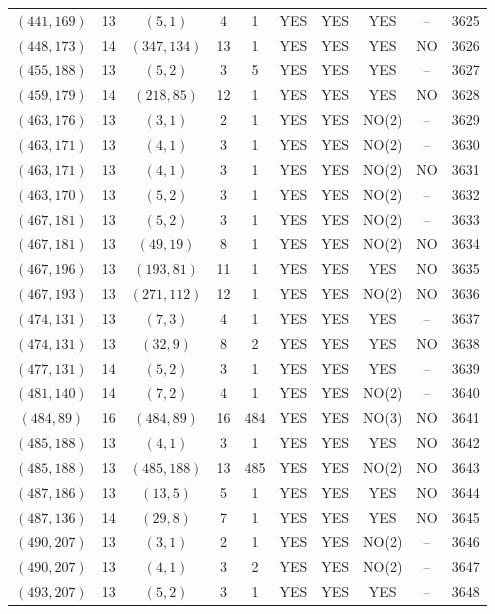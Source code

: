 \begin{longtable}{|c|c|c|c|c|c|c|c|c|c|}
$(441, 169)$ & 13 & $(5, 1)$ & 4 & 1 & YES & YES & YES & -- & 3625\\
$(448, 173)$ & 14 & $(347, 134)$ & 13 & 1 & YES & YES & YES & NO & 3626\\
$(455, 188)$ & 13 & $(5, 2)$ & 3 & 5 & YES & YES & YES & -- & 3627\\
$(459, 179)$ & 14 & $(218, 85)$ & 12 & 1 & YES & YES & YES & NO & 3628\\
$(463, 176)$ & 13 & $(3, 1)$ & 2 & 1 & YES & YES & NO(2) & -- & 3629\\
$(463, 171)$ & 13 & $(4, 1)$ & 3 & 1 & YES & YES & NO(2) & -- & 3630\\
$(463, 171)$ & 13 & $(4, 1)$ & 3 & 1 & YES & YES & NO(2) & NO & 3631\\
$(463, 170)$ & 13 & $(5, 2)$ & 3 & 1 & YES & YES & NO(2) & -- & 3632\\
$(467, 181)$ & 13 & $(5, 2)$ & 3 & 1 & YES & YES & NO(2) & -- & 3633\\
$(467, 181)$ & 13 & $(49, 19)$ & 8 & 1 & YES & YES & NO(2) & NO & 3634\\
$(467, 196)$ & 13 & $(193, 81)$ & 11 & 1 & YES & YES & YES & NO & 3635\\
$(467, 193)$ & 13 & $(271, 112)$ & 12 & 1 & YES & YES & NO(2) & NO & 3636\\
$(474, 131)$ & 13 & $(7, 3)$ & 4 & 1 & YES & YES & YES & -- & 3637\\
$(474, 131)$ & 13 & $(32, 9)$ & 8 & 2 & YES & YES & YES & NO & 3638\\
$(477, 131)$ & 14 & $(5, 2)$ & 3 & 1 & YES & YES & YES & -- & 3639\\
$(481, 140)$ & 14 & $(7, 2)$ & 4 & 1 & YES & YES & NO(2) & -- & 3640\\
$(484, 89)$ & 16 & $(484, 89)$ & 16 & 484 & YES & YES & NO(3) & NO & 3641\\
$(485, 188)$ & 13 & $(4, 1)$ & 3 & 1 & YES & YES & YES & NO & 3642\\
$(485, 188)$ & 13 & $(485, 188)$ & 13 & 485 & YES & YES & NO(2) & NO & 3643\\
$(487, 186)$ & 13 & $(13, 5)$ & 5 & 1 & YES & YES & YES & NO & 3644\\
$(487, 136)$ & 14 & $(29, 8)$ & 7 & 1 & YES & YES & YES & NO & 3645\\
$(490, 207)$ & 13 & $(3, 1)$ & 2 & 1 & YES & YES & NO(2) & -- & 3646\\
$(490, 207)$ & 13 & $(4, 1)$ & 3 & 2 & YES & YES & NO(2) & -- & 3647\\
$(493, 207)$ & 13 & $(5, 2)$ & 3 & 1 & YES & YES & YES & -- & 3648\\

\end{longtable}
